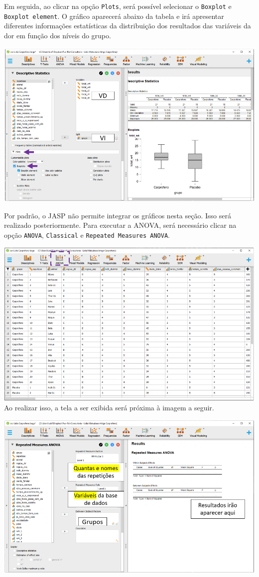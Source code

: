 \documentclass[
]{book}
\begin{document}
Em seguida, ao clicar na opção \texttt{Plots}, será possível selecionar o \texttt{Boxplot} e \texttt{Boxplot\ element}. O gráfico aparecerá abaixo da tabela e irá apresentar diferentes informações estatísticas da distribuição dos resultados das variáveis da dor em função dos níveis do grupo.

\includegraphics{./img/cap_anovarm_plots1.png}

Por padrão, o JASP não permite integrar os gráficos nesta seção. Isso será realizado posteriormente. Para executar a ANOVA, será necessário clicar na opção \texttt{ANOVA}, \texttt{Classical} e \texttt{Repeated\ Measures\ ANOVA}.

\includegraphics{./img/cap_anovarm_interface0.png}
Ao realizar isso, a tela a ser exibida será próxima à imagem a seguir.

\includegraphics{./img/cap_anovarm_interface.png}
\end{document}
